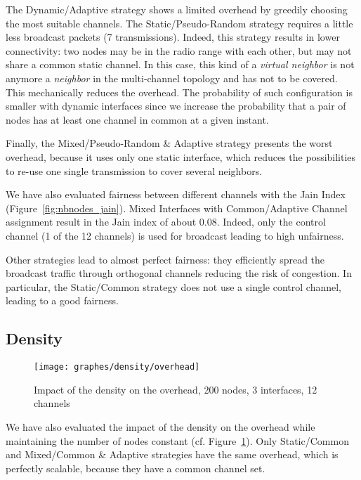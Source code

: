 \documentclass[twoside]{article}
\begin{document}
{The Dynamic/Adaptive strategy shows a limited overhead by greedily choosing the most suitable channels.
The Static/Pseudo-Random strategy requires a little less broadcast packets (7 transmissions). 
Indeed, this strategy results in lower connectivity: two nodes may be in the radio range with each other, but may not share a common static channel. 
In this case, this kind of a \emph{virtual neighbor} is not anymore a
\emph{neighbor} in the multi-channel topology and has not to be covered. 
This mechanically reduces the overhead.
The probability of such configuration is smaller with dynamic interfaces since
we increase the probability that a pair of nodes has at least one channel in common at a given instant. 


Finally, the Mixed/Pseudo-Random \& Adaptive strategy presents the worst
overhead, because it uses only one static interface, which reduces the possibilities to re-use one single transmission to cover several neighbors. 


We have also evaluated fairness between different channels with the Jain Index (Figure~\ref{fig:nbnodes_jain}).
Mixed Interfaces with Common/Adaptive Channel assignment result in the Jain index of about 0.08.
Indeed, only the control channel (1 of the 12 channels) is used for broadcast leading to high unfairness.

Other strategies lead to almost perfect fairness: they efficiently spread the broadcast traffic through orthogonal channels reducing the risk of congestion.
In particular, the Static/Common strategy does not use a single control channel, leading to a good fairness.







\subsection{Density}

\begin{figure}[t]
\begin{center}
	\texttt{[image: graphes/density/overhead]}
	\caption{Impact of the density on the overhead, 200 nodes, 3 interfaces, 12 channels}
	\label{fig:density_overhead}
\end{center}
\end{figure}


We have also evaluated the impact of the density on the overhead while
maintaining the number of nodes constant (cf. Figure~\ref{fig:density_overhead}). 
Only Static/Common and Mixed/Common \& Adaptive strategies have the same overhead, which is perfectly
scalable, because they have a common channel set. 

}
\end{document}
